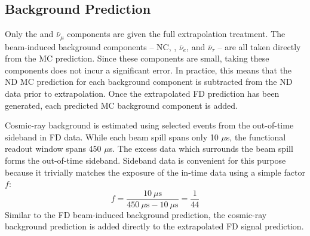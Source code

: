 \subsection{Background Prediction}

Only the \numu and $\bar{\nu}_\mu$ components are given the full extrapolation
treatment.
The beam-induced background components -- NC, \nue, $\bar{\nu}_e$, \nutau and
$\bar{\nu}_\tau$ -- are all taken directly from the MC prediction.
Since these components are small, taking these components does not incur
a significant error.
In practice, this means that the ND MC prediction for each background component
is subtracted from the ND data prior to extrapolation.
Once the extrapolated FD prediction has been generated, each predicted MC
background component is added.


Cosmic-ray background is estimated using selected events from the out-of-time
sideband in FD data.
While each \numi beam spill spans only 10 $\mu$s, the functional readout window
spans 450 $\mu$s.
The excess data which surrounds the beam spill forms the out-of-time sideband.
Sideband data is convenient for this purpose because it trivially
matches the exposure of the in-time data using a simple factor $f$:
\begin{equation}
f = \frac{10~\mu\text{s}}{ 450~\mu\text{s} - 10~\mu\text{s}} = \frac{1}{44}
\end{equation}
Similar to the FD beam-induced background prediction, the cosmic-ray
background prediction is added directly to the extrapolated FD signal
prediction.


